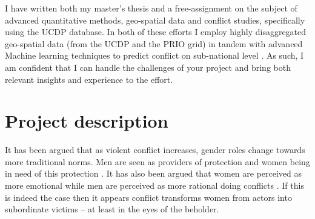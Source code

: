 \documentclass[a4paper]{article}
\begin{document}
I have written both my master's thesis \citep{SPECIALE} and a free-assignment \citep{Maase} on the subject of advanced quantitative methods, geo-spatial data and conflict studies, specifically using the UCDP database. In both of these efforts I employ highly disaggregated geo-spatial data (from the UCDP and the PRIO grid) in tandem with advanced Machine learning techniques to predict conflict on sub-national level \citep{Maase, SPECIALE}. As such, I am confident that I can handle the challenges of your project and bring both relevant insights and experience to the effort.\par


\section{Project description}




It has been argued that as violent conflict increases, gender roles change towards more traditional norms. Men are seen as providers of protection and women being in need of this protection \citep{elshtain1995women, carpenter2003women}. It has also been argued that women are perceived as more emotional while men are perceived as more rational doing conflicts \citep{elshtain1993public}. If this is indeed the case then it appears conflict transforms women from actors into subordinate victims -- at least in the eyes of the beholder.\par 
\end{document}
